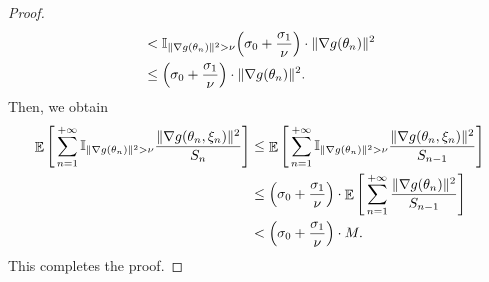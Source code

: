 \documentclass[standalone]{article}
\newcommand{\I}{\mathbb{I}}
\DeclareMathOperator{\Expect}{\mathbb{E}}
\begin{document}
\begin{proof}
\begin{align}
    & <  \I_{\|\nabla g(\theta_{n})\|^{2}>\nu}\Big({\sigma_{0}}+{\frac{\sigma_{1}}{{\nu}}}\Big)\cdot\|\nabla g(\theta_{n})\|^{2}\notag\\&\le \Big({\sigma_{0}}+{\frac{\sigma_{1}}{\nu}}\Big)\cdot\|\nabla g(\theta_{n})\|^{2}.
\end{align}
Then, we obtain
\begin{align*}
    \Expect\Bigg[ \sum_{n=1}^{+\infty}\I_{\|\nabla g(\theta_{n})\|^{2}>\nu}\frac{\|\nabla g(\theta_{n},\xi_{n})\|^{2}}{S_{n}}\Bigg]&\le\Expect\Bigg[ \sum_{n=1}^{+\infty}\I_{\|\nabla g(\theta_{n})\|^{2}>\nu}\frac{\|\nabla g(\theta_{n},\xi_{n})\|^{2}}{S_{n-1}}\Bigg]\notag\\&\le\Big({\sigma_{0}}+{\frac{\sigma_{1}}{\nu}}\Big)\cdot\Expect\Bigg[\sum_{n=1}^{+\infty}\frac{\|\nabla g(\theta_{n})\|^{2}}{S_{n-1}}\Bigg] \\&<\Big({\sigma_{0}}+{\frac{\sigma_{1}}{{\nu}}}\Big)\cdot M.
\end{align*}
This completes the proof. 
\end{proof}
\end{document}
